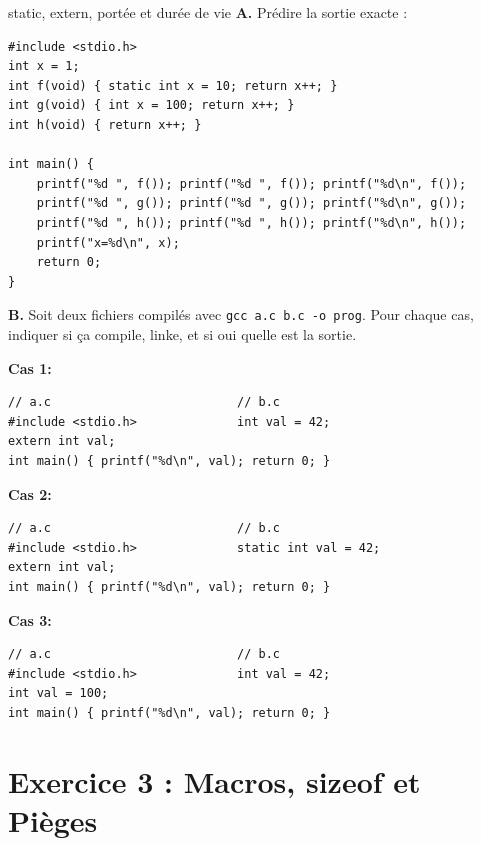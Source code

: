 \documentclass[10pt,a4paper]{article}
\begin{document}
\begin{exercicebox}{static, extern, portée et durée de vie}
\textbf{A.} Prédire la sortie exacte :
\begin{lstlisting}
#include <stdio.h>
int x = 1;
int f(void) { static int x = 10; return x++; }
int g(void) { int x = 100; return x++; }
int h(void) { return x++; }

int main() {
    printf("%d ", f()); printf("%d ", f()); printf("%d\n", f());
    printf("%d ", g()); printf("%d ", g()); printf("%d\n", g());
    printf("%d ", h()); printf("%d ", h()); printf("%d\n", h());
    printf("x=%d\n", x);
    return 0;
}
\end{lstlisting}

\textbf{B.} Soit deux fichiers compilés avec \texttt{gcc a.c b.c -o prog}. Pour chaque cas, indiquer si ça compile, linke, et si oui quelle est la sortie.

\textbf{Cas 1:}
\begin{lstlisting}
// a.c                          // b.c
#include <stdio.h>              int val = 42;
extern int val;
int main() { printf("%d\n", val); return 0; }
\end{lstlisting}

\textbf{Cas 2:}
\begin{lstlisting}
// a.c                          // b.c
#include <stdio.h>              static int val = 42;
extern int val;
int main() { printf("%d\n", val); return 0; }
\end{lstlisting}

\textbf{Cas 3:}
\begin{lstlisting}
// a.c                          // b.c
#include <stdio.h>              int val = 42;
int val = 100;
int main() { printf("%d\n", val); return 0; }
\end{lstlisting}
\end{exercicebox}

\section*{Exercice 3 : Macros, sizeof et Pièges}
\end{document}
